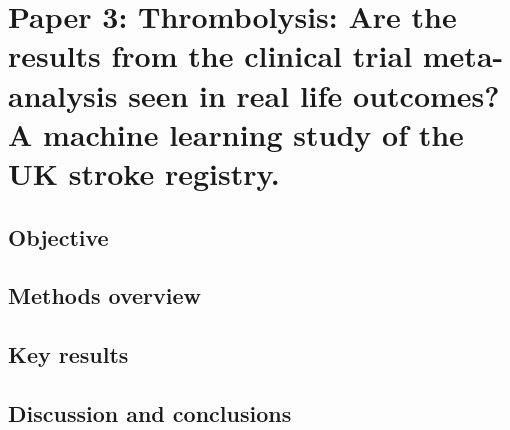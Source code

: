 \section{Paper 3: Thrombolysis: Are the results from the clinical trial meta-analysis seen in real life outcomes?  A machine learning study of the UK stroke registry.\cite{pearn_are_2024}}\label{sec:paper_3}

\subsection{Objective}

\subsection{Methods overview}

\subsection{Key results}

\subsection{Discussion and conclusions}